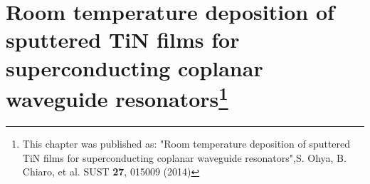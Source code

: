 \chapter[Room temperature deposition of sputtered TiN films for superconducting coplanar waveguide resonators]{Room temperature deposition of sputtered TiN films for superconducting coplanar waveguide resonators\footnote{This chapter was published as: "Room temperature deposition of sputtered TiN films for superconducting coplanar waveguide resonators",S. Ohya, B. Chiaro, et al. SUST \textbf{27}, 015009 (2014)}}
\label{ch:TiN}

